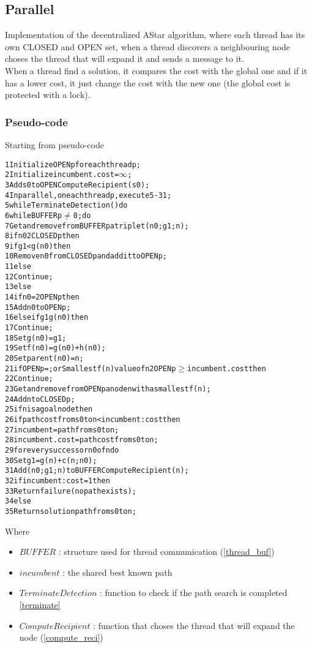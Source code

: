 \subsection{Parallel}

Implementation of the decentralized AStar algorithm, where each thread has its own CLOSED and OPEN set, when a thread discovers a neighbouring node choses the thread that will expand it and sends a message to it.
\\
When a thread find a solution, it compares the cost with the global one and if it has a lower cost, it just change the cost with the new one (the global cost is protected with a lock).

\subsubsection{Pseudo-code}

Starting from pseudo-code \cite{bibParAstar}

\begin{alltt}
    1 Initialize OPENp for each thread p;
    2 Initialize incumbent.cost = \(\infty\);
    3 Add s0 to OPENComputeRecipient(s0);
    4 In parallel, on each thread p, execute 5-31;
    5 while TerminateDetection() do
    6   while BUFFERp \(\neq\) 0 ; do
    7       Get and remove from BUFFERp a triplet (n0; g1; n);
    8       if n0 2 CLOSEDp then
    9           if g1 < g(n0) then
    10              Remove n0 from CLOSEDp and add it to OPENp;
    11             else
    12                  Continue;
    13      else
    14          if n0 =2 OPENp then
    15              Add n0 to OPENp;
    16          else if g1  g(n0) then
    17              Continue;
    18      Set g(n0) = g1;
    19      Set f(n0) = g(n0) + h(n0);
    20      Set parent(n0) = n;
    21  if OPENp = ; or Smallest f(n) value of n 2 OPENp \(\geq\) incumbent.cost then
    22      Continue;
    23  Get and remove from OPENp a node n with a smallest f(n);
    24  Add n to CLOSEDp;
    25  if n is a goal node then
    26      if path cost from s0 to n < incumbent:cost then
    27          incumbent = path from s0 to n;
    28          incumbent.cost = path cost from s0 to n;
    29  for every successor n0 of n do
    30      Set g1 = g(n) + c(n; n0);
    31      Add (n0; g1; n) to BUFFER ComputeRecipient(n);
    32 if incumbent:cost = 1 then
    33  Return failure (no path exists);
    34 else
    35  Return solution path from s0 to n;
\end{alltt}

Where
\begin{itemize}
    \item $BUFFER$ : structure used for thread communication (\ref{thread_buf})
    \item $incumbent$ : the shared best known path
    \item $TerminateDetection$ : function to check if the path search is completed \ref{terminate}
    \item $ComputeRecipient$ : function that choses the thread that will expand the node (\ref{compute_reci})
\end{itemize}

